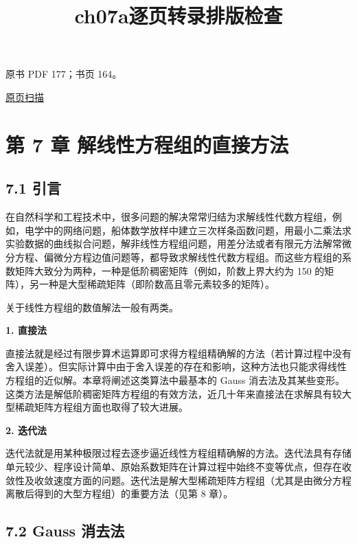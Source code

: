 \documentclass[
  10pt,
  fontset=fandol]{ctexart}
\title{ch07a逐页转录排版检查}
\author{}
\date{}
\begin{document}
\maketitle

\clearpage

原书 PDF 177；书页 164。

\href{/Users/xiangjunfeng/Desktop/数值计算专用/numerical-analysis/book/source-images/pdf-177.jpeg}{原页扫描}

\section{第 7 章 解线性方程组的直接方法}\label{ux7b2c-7-ux7ae0-ux89e3ux7ebfux6027ux65b9ux7a0bux7ec4ux7684ux76f4ux63a5ux65b9ux6cd5}

\subsection{7.1 引言}\label{ux5f15ux8a00}

在自然科学和工程技术中，很多问题的解决常常归结为求解线性代数方程组，例如，电学中的网络问题，船体数学放样中建立三次样条函数问题，用最小二乘法求实验数据的曲线拟合问题，解非线性方程组问题，用差分法或者有限元方法解常微分方程、偏微分方程边值问题等，都导致求解线性代数方程组。而这些方程组的系数矩阵大致分为两种，一种是低阶稠密矩阵（例如，阶数上界大约为 150 的矩阵），另一种是大型稀疏矩阵（即阶数高且零元素较多的矩阵）。

关于线性方程组的数值解法一般有两类。

\textbf{1. 直接法}

直接法就是经过有限步算术运算即可求得方程组精确解的方法（若计算过程中没有舍入误差）。但实际计算中由于舍入误差的存在和影响，这种方法也只能求得线性方程组的近似解。本章将阐述这类算法中最基本的 Gauss 消去法及其某些变形。这类方法是解低阶稠密矩阵方程组的有效方法，近几十年来直接法在求解具有较大型稀疏矩阵方程组方面也取得了较大进展。

\textbf{2. 迭代法}

迭代法就是用某种极限过程去逐步逼近线性方程组精确解的方法。迭代法具有存储单元较少、程序设计简单、原始系数矩阵在计算过程中始终不变等优点，但存在收敛性及收敛速度方面的问题。迭代法是解大型稀疏矩阵方程组（尤其是由微分方程离散后得到的大型方程组）的重要方法（见第 8 章）。

\subsection{7.2 Gauss 消去法}\label{gauss-ux6d88ux53bbux6cd5}
\end{document}
